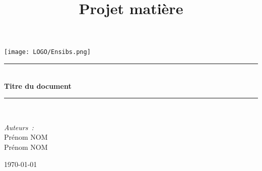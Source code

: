\documentclass[12pt]{article}
\title{Projet matière}
\begin{document}
\begin{titlepage}

\newcommand{\HRule}{\rule{\linewidth}{0.5mm}}

\center %
 

\texttt{[image: LOGO/Ensibs.png]}\\[1cm] %


\HRule \\[0.4cm]
{ \huge \bfseries Titre du document
}\\[0.4cm]
\HRule \\[1.5cm]
 



\begin{flushleft} \large
\emph{Auteurs :}\\
Prénom \textsc{NOM}\\
Prénom \textsc{NOM}\\
\end{flushleft}



{\large \today}\\[2cm] %

\vfill %

\end{titlepage}
\end{document}
